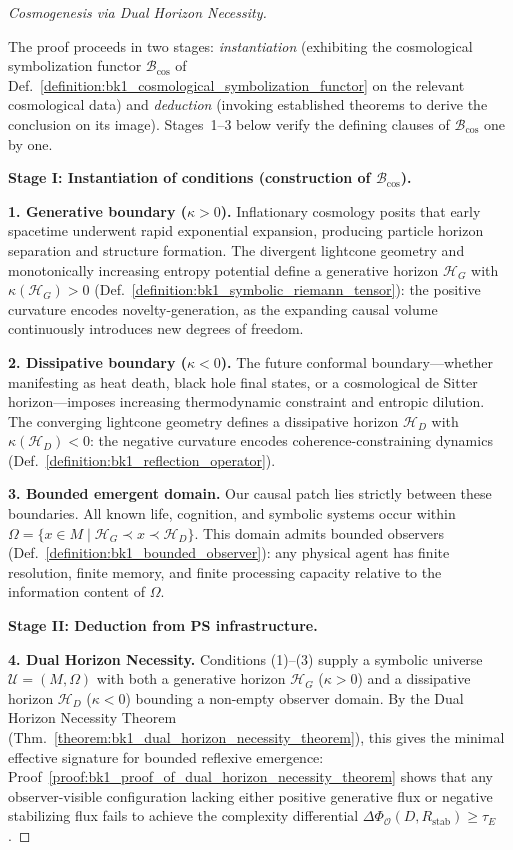 \begin{proof}[Cosmogenesis via Dual Horizon Necessity]
\label{proof:bk1_sketch_observed_consequences}
\leavevmode

The proof proceeds in two stages: \emph{instantiation} (exhibiting the
cosmological symbolization functor $\mathcal{B}_{\mathrm{cos}}$ of
Def.~\ref{definition:bk1_cosmological_symbolization_functor} on the relevant
cosmological data) and \emph{deduction} (invoking established theorems to derive
the conclusion on its image). Stages~1--3 below verify the defining clauses of
$\mathcal{B}_{\mathrm{cos}}$ one by one.

\medskip
\textbf{Stage I: Instantiation of conditions (construction of $\mathcal{B}_{\mathrm{cos}}$).}

\textbf{1. Generative boundary ($\kappa > 0$).}\enspace
Inflationary cosmology posits that early spacetime underwent rapid exponential expansion, producing particle horizon separation and structure formation. The divergent lightcone geometry and monotonically increasing entropy potential define a generative horizon $\mathcal{H}_G$ with $\kappa(\mathcal{H}_G) > 0$ (Def.~\ref{definition:bk1_symbolic_riemann_tensor}): the positive curvature encodes novelty-generation, as the expanding causal volume continuously introduces new degrees of freedom.

\textbf{2. Dissipative boundary ($\kappa < 0$).}\enspace
The future conformal boundary---whether manifesting as heat death, black hole final states, or a cosmological de Sitter horizon---imposes increasing thermodynamic constraint and entropic dilution. The converging lightcone geometry defines a dissipative horizon $\mathcal{H}_D$ with $\kappa(\mathcal{H}_D) < 0$: the negative curvature encodes coherence-constraining dynamics (Def.~\ref{definition:bk1_reflection_operator}).

\textbf{3. Bounded emergent domain.}\enspace
Our causal patch lies strictly between these boundaries. All known life, cognition, and symbolic systems occur within $\Omega = \{x \in M \mid \mathcal{H}_G \prec x \prec \mathcal{H}_D\}$. This domain admits bounded observers (Def.~\ref{definition:bk1_bounded_observer}): any physical agent has finite resolution, finite memory, and finite processing capacity relative to the information content of $\Omega$.

\medskip
\textbf{Stage II: Deduction from PS infrastructure.}

\textbf{4. Dual Horizon Necessity.}\enspace
Conditions (1)--(3) supply a symbolic universe $\mathcal{U} = (M, \Omega)$ with both a generative horizon $\mathcal{H}_G$ ($\kappa > 0$) and a dissipative horizon $\mathcal{H}_D$ ($\kappa < 0$) bounding a non-empty observer domain. By the Dual Horizon Necessity Theorem (Thm.~\ref{theorem:bk1_dual_horizon_necessity_theorem}), this gives the minimal effective signature for bounded reflexive emergence: Proof~\ref{proof:bk1_proof_of_dual_horizon_necessity_theorem} shows that any observer-visible configuration lacking either positive generative flux or negative stabilizing flux fails to achieve the complexity differential $\Delta\Phi_{\mathcal{O}}(D, R_{\mathrm{stab}}) \geq \tau_E$.


\end{proof}
